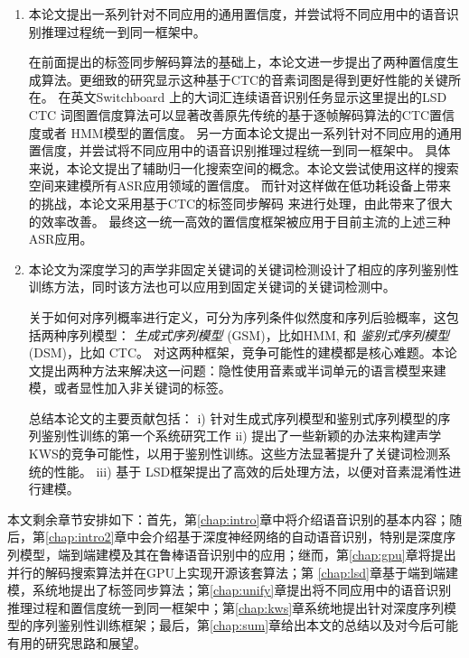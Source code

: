 \begin{enumerate}
\item 本论文提出一系列针对不同应用的通用置信度，并尝试将不同应用中的语音识别推理过程统一到同一框架中。

在前面提出的标签同步解码算法的基础上，本论文进一步提出了两种置信度生成算法。更细致的研究显示这种基于CTC的音素词图是得到更好性能的关键所在。
在英文Switchboard 上的大词汇连续语音识别任务显示这里提出的LSD CTC 词图置信度算法可以显著改善原先传统的基于逐帧解码算法的CTC置信度或者 HMM模型的置信度。
%
另一方面本论文提出一系列针对不同应用的通用置信度，并尝试将不同应用中的语音识别推理过程统一到同一框架中。
%
具体来说，本论文提出了辅助归一化搜索空间的概念。本论文尝试使用这样的搜索空间来建模所有ASR应用领域的置信度。 %
而针对这样做在低功耗设备上带来的挑战，本论文采用基于CTC的标签同步解码\cite{Chen+2016} 来进行处理，由此带来了很大的效率改善。
最终这一统一高效的置信度框架被应用于目前主流的上述三种 ASR应用。

\item 
本论文为深度学习的声学非固定关键词的关键词检测设计了相应的序列鉴别性训练方法，同时该方法也可以应用到固定关键词的关键词检测中。

关于如何对序列概率进行定义，可分为序列条件似然度和序列后验概率，这包括两种序列模型： {\em 生成式序列模型} (GSM)，比如HMM, 和 {\em 鉴别式序列模型} (DSM)，比如 CTC。
对这两种框架，竞争可能性的建模都是核心难题。本论文提出两种方法来解决这一问题：隐性使用音素或半词单元的语言模型来建模，或者显性加入非关键词的标签。

总结本论文的主要贡献包括：
i) 针对生成式序列模型和鉴别式序列模型的序列鉴别性训练的第一个系统研究工作
ii) 提出了一些新颖的办法来构建声学KWS的竞争可能性，以用于鉴别性训练。这些方法显著提升了关键词检测系统的性能。
iii) 基于 LSD框架提出了高效的后处理方法，以便对音素混淆性进行建模。
\end{enumerate}

本文剩余章节安排如下：首先，第\ref{chap:intro}章中将介绍语音识别的基本内容；随后，第\ref{chap:intro2}章中会介绍基于深度神经网络的自动语音识别，特别是深度序列模型，端到端建模及其在鲁棒语音识别中的应用；继而，第\ref{chap:gpu}章将提出并行的解码搜索算法并在GPU上实现开源该套算法；第
\ref{chap:lsd}章基于端到端建模，系统地提出了标签同步算法；第\ref{chap:unify}章提出将不同应用中的语音识别推理过程和置信度统一到同一框架中；第\ref{chap:kws}章系统地提出针对深度序列模型的序列鉴别性训练框架；最后，第\ref{chap:sum}章给出本文的总结以及对今后可能有用的研究思路和展望。
